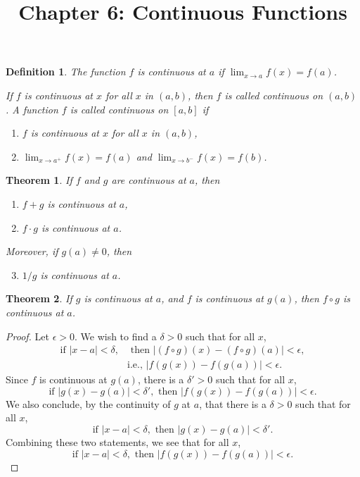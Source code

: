 \documentclass{article}
\newtheorem{definition}{Definition}
\newtheorem{theorem}{Theorem}
\begin{document}
\title{Chapter 6: Continuous Functions}
\maketitle

\begin{definition}
  The function $f$ is \emph{continuous at $a$} if $\lim_{x \to a} f(x) = f(a)$.

  If $f$ is continuous at $x$ for all $x$ in $(a, b)$, then $f$ is called
  \emph{continuous on $(a, b)$}. A function $f$ is called \emph{continuous on
  $[a, b]$} if
  \begin{enumerate}
    \item $f$ is continuous at $x$ for all $x$ in $(a, b)$,
    \item $\lim_{x \to a^+} f(x) = f(a)$ and $\lim_{x \to b^-} f(x) = f(b)$.
  \end{enumerate}
\end{definition}

\begin{theorem}
  If $f$ and $g$ are continuous at $a$, then
  \begin{enumerate}
    \item $f + g$ is continuous at $a$,
    \item $f \cdot g$ is continuous at $a$.
  \end{enumerate}
  Moreover, if $g(a) \neq 0$, then
  \begin{enumerate}
    \setcounter{enumi}{2}
    \item $1/g$ is continuous at $a$.
  \end{enumerate}
\end{theorem}

\begin{theorem}
  If $g$ is continuous at $a$, and $f$ is continuous at $g(a)$, then $f \circ
  g$ is continuous at $a$.
\end{theorem}
\begin{proof}
  Let $\epsilon > 0$. We wish to find a $\delta > 0$ such that for all $x$,
  \begin{align*}
    \text{if } |x - a| < \delta, &\text{ then } |(f \circ g)(x) -
    (f \circ g)(a)| < \epsilon, \\
    &\text{i.e., } |f(g(x)) - f(g(a))| < \epsilon.
  \end{align*}
  Since $f$ is continuous at $g(a)$, there is a $\delta' > 0$ such that for all
  $x$, \[
    \text{if } |g(x) - g(a)| < \delta', \text{ then } |f(g(x)) - f(g(a))| <
      \epsilon.
  \] We also conclude, by the continuity of $g$ at $a$, that there is a $\delta
  > 0$ such that for all $x$, \[
    \text{if } |x - a| < \delta, \text{ then } |g(x) - g(a)| < \delta'.
  \] Combining these two statements, we see that for all $x$, \[
    \text{if } |x - a| < \delta, \text{ then } |f(g(x)) - f(g(a))| < \epsilon.
  \]
\end{proof}
\end{document}
